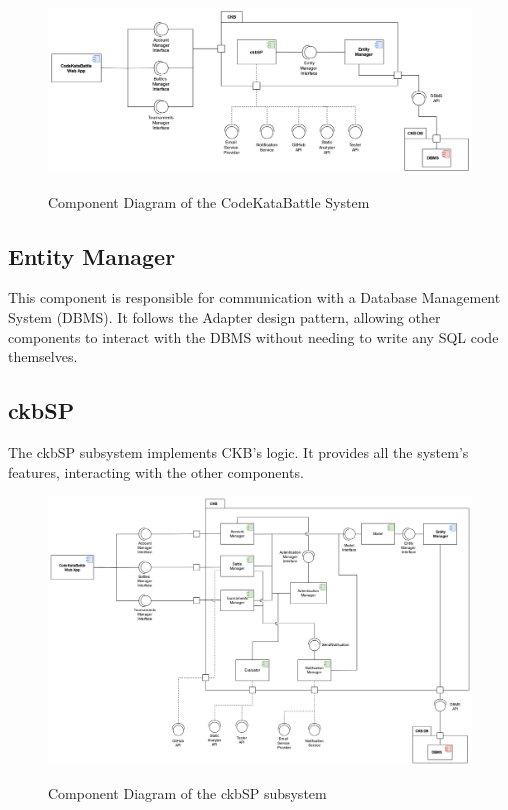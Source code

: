 \documentclass{Configuration_Files/Template}
\begin{document}
\begin{figure}[H]
\centering
\includegraphics[scale = 0.6]{DD_latex/Images/diagrams/Component_view.png}\\
\caption{Component Diagram of the CodeKataBattle System}
\end{figure}

\subsection{Entity Manager}

This component is responsible for communication with a Database Management System (DBMS). It follows the Adapter design pattern, allowing other components to interact with the DBMS without needing to write any SQL code themselves.

\subsection{ckbSP}

The ckbSP subsystem implements CKB's logic. It provides all the system's features, interacting with the other components.

\begin{figure}[H]
\centering
\includegraphics[scale = 0.6]{DD_latex/Images/diagrams/ComponentViewCKBSP.png}\\
\caption{Component Diagram of the ckbSP subsystem}
\end{figure}
\end{document}
